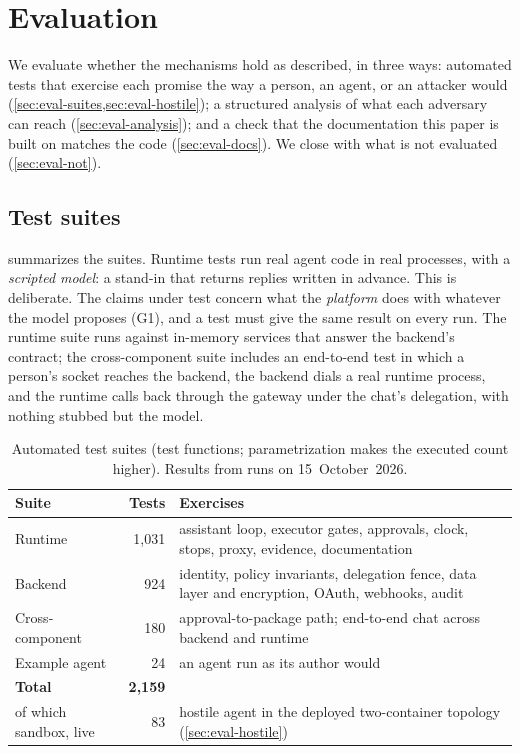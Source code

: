 \section{Evaluation}
\label{sec:evaluation}

We evaluate whether the mechanisms hold as described, in three ways:
automated tests that exercise each promise the way a person, an agent,
or an attacker would (\cref{sec:eval-suites,sec:eval-hostile});
a structured analysis of what each adversary can reach
(\cref{sec:eval-analysis}); and a check that the documentation this
paper is built on matches the code (\cref{sec:eval-docs}). We close
with what is not evaluated (\cref{sec:eval-not}).

\subsection{Test suites}
\label{sec:eval-suites}

 summarizes the suites. Runtime tests run real agent
code in real processes, with a \emph{scripted model}: a stand-in that
returns replies written in advance. This is deliberate. The claims
under test concern what the \emph{platform} does with whatever the
model proposes (G1), and a test must give the same result on every run.
The runtime suite runs against in-memory services that answer the
backend's contract; the cross-component suite includes an end-to-end
test in which a person's socket reaches the backend, the backend dials
a real runtime process, and the runtime calls back through the gateway
under the chat's delegation, with nothing stubbed but the model.

\begin{table}[t]
\centering\small
\caption{Automated test suites (test functions; parametrization makes
the executed count higher). Results from runs on 15~October~2026.}
\label{tab:suites}
\begin{tabularx}{\columnwidth}{@{}>{\raggedright\arraybackslash}p{}r>{\raggedright\arraybackslash}X@{}}
\toprule
\textbf{Suite} & \textbf{Tests} & \textbf{Exercises} \\
\midrule
Runtime & 1{,}031 & assistant loop, executor gates, approvals, clock, stops, proxy, evidence, documentation \\
Backend & 924 & identity, policy invariants, delegation fence, data layer and encryption, OAuth, webhooks, audit \\
Cross-component & 180 & approval-to-package path; end-to-end chat across backend and runtime \\
Example agent & 24 & an agent run as its author would \\
\midrule
\textbf{Total} & \textbf{2{,}159} & \\
\quad of which sandbox, live & 83 & hostile agent in the deployed two-container topology (\cref{sec:eval-hostile}) \\
\bottomrule
\end{tabularx}
\end{table}

